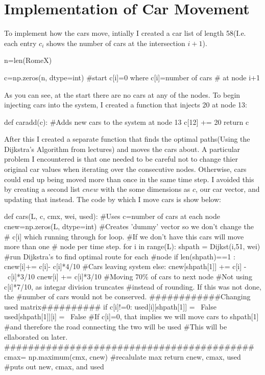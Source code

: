\documentclass[paper=a4, fontsize=12pt]{scrartcl} %
\numberwithin{equation}{section}       %
\numberwithin{figure}{section}         %
\numberwithin{table}{section}          %
\begin{document}
\section{Implementation of Car Movement}
To implement how the cars move, intially I created a car list of length 58(I.e. each entry $c_i$ shows the number of cars at the intersection $i+1$). 
\begin{python}
n=len(RomeX)

c=np.zeros(n, dtype=int) 
#start c[i]=0 where c[i]=number of cars
# at node i+1
\end{python}
As you can see, at the start there are no cars at any of the nodes. To begin injecting cars into the system, I created a function that injects 20 at node 13:
\begin{python}
def caradd(c): #Adds new cars to the system at node 13
c[12] += 20
return c
\end{python}
After this I created a separate function that finds the optimal paths(Using the Dijkstra's Algorithm from lectures) and moves the cars about. A particular problem I encountered is that one needed to be careful not to change thier original car values when iterating over the consecutive nodes. Otherwise, cars could end up being moved more than once in the same time step. I avoided this by creating a second list $cnew$ with the some dimensions as $c$, our car vector, and updating that instead. The code by which I move cars is show below:
\begin{python}
def cars(L, c, cmx, wei, used):
	#Uses c=number of cars at each node
	cnew=np.zeros(L, dtype=int)
	#Creates 'dummy' vector so we don't change the
	# c[i] which running through for loop.
	#If we don't have this cars will move more than one
	# node per time step.
	for i in range(L):
		shpath = Dijkst(i,51, wei)
		#run Dijkstra's to find optimal route for each
		#node
			if len(shpath)==1 :
				cnew[i]+= c[i]- c[i]*4/10
				#Cars leaving system 
			else:
				cnew[shpath[1]] += c[i] -\
				c[i]*3/10
				cnew[i] += c[i]*3/10
			#Moving 70\% of cars to next node
#Not using c[i]*7/10, as integar division truncates 
#instead of rounding. If this was not done, the 
#number of cars would not be conserved.
############Changing used matrix##########
				if c[i]!=0:
					used[i][shpath[1]] = \
					 False
					used[shpath[1]][i] = \
					 False
#If c[i]=0, that implies we will move cars to shpath[1]
#and therefore the road connecting the two will be used
#This will be ellaborated on later.
##########################################
	cmax= np.maximum(cmx, cnew)
	#recalulate max
	return cnew, cmax, used
	#puts out new, cmax, and used	
\end{python}
\end{document}
